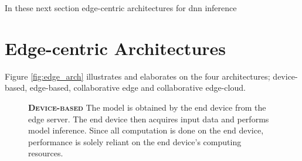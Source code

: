 In these next section edge-centric architectures for \gls{dnn} inference

\newpage
\section{Edge-centric Architectures} \label{sec:ei-architecture}

Figure \ref{fig:edge_arch} illustrates and elaborates on the four architectures; \protect{} device-based, \protect{} edge-based, \protect{} collaborative edge and \protect{} collaborative edge-cloud. 

\begin{figure}
	\begin{minipage}{0.65\linewidth}
		\textbf{\protect{} \textsc{Device-based}}
		\color{caption-color} \newline
		The model is obtained by the end device from the edge server. The end device then acquires input data and performs model inference. Since all computation is done on the end device, performance is solely reliant on the end device's computing resources. 
	\end{minipage}%
	\hfill
	\begin{minipage}{0.3\linewidth}
		\centering
		\captionsetup[subfigure]{justification=centering}
		\begin{figure}
			\centering

\end{figure}
\end{minipage}
\end{figure}
